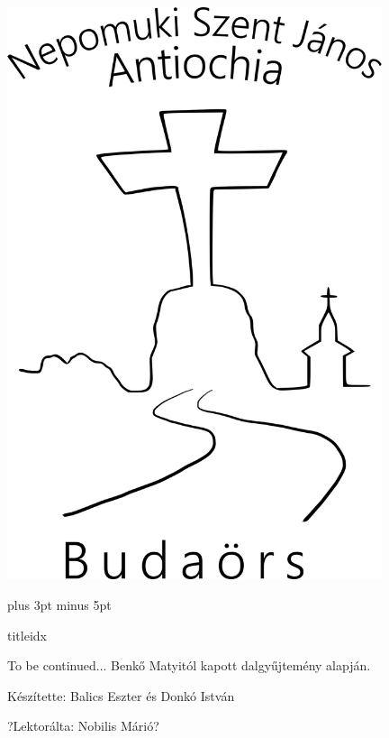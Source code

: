 \documentclass[a5paper,twoside]{article}
\author{Benkő Matyi - Donkó István}
\begin{document}
  \begin{titlepage}
    \setlength{\oddsidemargin}{-1.3cm}

    \vspace*{0.75cm}
    \includegraphics[width=11cm]{Logo_07_final}
  \end{titlepage}



  \versesep=12pt plus 3pt minus 5pt

  \begin{songs}{titleidx}
    
  \end{songs}

  To be continued...
  \vfill
  Benkő Matyitól kapott dalgyűjtemény alapján.

  Készítette: Balics Eszter és Donkó István

  ?Lektorálta: Nobilis Márió?
\end{document}

